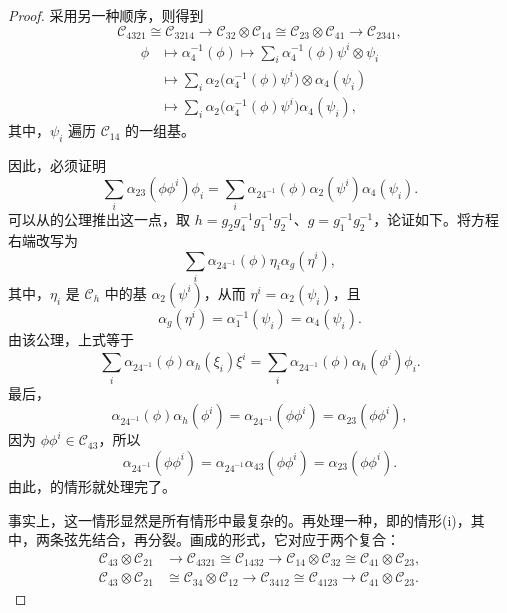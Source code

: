 \begin{proof}
采用另一种顺序，则得到
\[
\mathcal{C}_{4321}\cong\mathcal{C}_{3214}\longrightarrow\mathcal{C}_{32}\otimes\mathcal{C}_{14}
\cong\mathcal{C}_{23}\otimes\mathcal{C}_{41}\longrightarrow\mathcal{C}_{2341},
\]
\[
\begin{aligned}
\phi&\longmapsto\alpha_4^{-1}(\phi)
\longmapsto\sum_i\alpha_4^{-1}(\phi)\psi^i\otimes\psi_i\\
&\longmapsto\sum_i\alpha_2\bigl(\alpha_4^{-1}(\phi)\psi^i\bigr)\otimes\alpha_4(\psi_i)\\
&\longmapsto\sum_i\alpha_2\bigl(\alpha_4^{-1}(\phi)\psi^i\bigr)\alpha_4(\psi_i),
\end{aligned}
\]
其中，$\psi_i$ 遍历 $\mathcal{C}_{14}$ 的一组基。

因此，必须证明
\[
\sum_i\alpha_{23}(\phi\phi^i)\phi_i
=\sum_i\alpha_{24^{-1}}(\phi)\alpha_2(\psi^i)\alpha_4(\psi_i).
\]
可以从的公理推出这一点，取 $h=g_2g_4^{-1}g_1^{-1}g_2^{-1}$、$g=g_1^{-1}g_2^{-1}$，论证如下。将方程右端改写为
\[
\sum_i\alpha_{24^{-1}}(\phi)\eta_i\alpha_g(\eta^i),
\]
其中，$\eta_i$ 是 $\mathcal{C}_h$ 中的基 $\alpha_2(\psi^i)$，从而 $\eta^i=\alpha_2(\psi_i)$，且
\[
\alpha_g(\eta^i)=\alpha_1^{-1}(\psi_i)=\alpha_4(\psi_i).
\]
由该公理，上式等于
\[
\sum_i\alpha_{24^{-1}}(\phi)\alpha_h(\xi_i)\xi^i
=\sum_i\alpha_{24^{-1}}(\phi)\alpha_h(\phi^i)\phi_i.
\]
最后，
\[
\alpha_{24^{-1}}(\phi)\alpha_h(\phi^i)
=\alpha_{24^{-1}}(\phi\phi^i)=\alpha_{23}(\phi\phi^i),
\]
因为 $\phi\phi^i\in\mathcal{C}_{43}$，所以
\[
\alpha_{24^{-1}}(\phi\phi^i)
=\alpha_{24^{-1}}\alpha_{43}(\phi\phi^i)=\alpha_{23}(\phi\phi^i).
\]
由此，的情形就处理完了。

事实上，这一情形显然是所有情形中最复杂的。再处理一种，即的情形(i)，其中，两条弦先结合，再分裂。画成的形式，它对应于两个复合：
\[
\begin{aligned}
\mathcal{C}_{43}\otimes\mathcal{C}_{21}
&\longrightarrow\mathcal{C}_{4321}\cong\mathcal{C}_{1432}
\longrightarrow\mathcal{C}_{14}\otimes\mathcal{C}_{32}\cong\mathcal{C}_{41}\otimes\mathcal{C}_{23},\\
\mathcal{C}_{43}\otimes\mathcal{C}_{21}
&\cong\mathcal{C}_{34}\otimes\mathcal{C}_{12}
\longrightarrow\mathcal{C}_{3412}\cong\mathcal{C}_{4123}
\longrightarrow\mathcal{C}_{41}\otimes\mathcal{C}_{23}.
\end{aligned}
\]


\end{proof}
